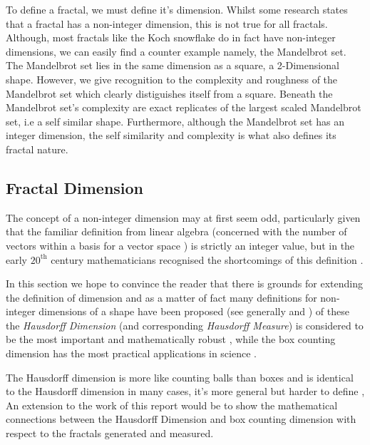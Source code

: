 \documentclass[11pt]{article}
\begin{document}
To define a fractal, we must define it's dimension. Whilst some research states that a fractal has a non-integer dimension, this is not true for all fractals. Although, most fractals like the Koch snowflake do in fact have non-integer dimensions, we can easily find a counter example namely, the Mandelbrot set. The Mandelbrot set lies in the same dimension as a square, a 2-Dimensional shape. However, we give recognition to the complexity and roughness of the Mandelbrot set which clearly distiguishes itself from a square. Beneath the Mandelbrot set's complexity are exact replicates of the largest scaled Mandelbrot set, i.e a self similar shape. Furthermore, although the Mandelbrot set has an integer dimension, the self similarity and complexity is what also defines its fractal nature.

\subsection{Fractal Dimension}
\label{sec:org9579076}
The concept of a non-integer dimension may at first seem odd, particularly given that the familiar definition from linear algebra (concerned with the number of vectors within a basis for a vector space \cite{larsonElementaryLinearAlgebra1991}) is strictly an integer value, but in the early \(20^{\mathrm{th}}\) century mathematicians recognised the shortcomings of this definition \cite[Ch. 3]{mandelbrotFractalGeometryNature1982}.

In this section we hope to convince the reader that there is grounds for
extending the definition of dimension and as a matter of fact many definitions
for non-integer dimensions of a shape have been proposed (see generally
\cite[Ch. 39]{mandelbrotFractalGeometryNature1982} and
\cite[\S 1.3]{gouyetPhysicsFractalStructures1996}) of these the \emph{Hausdorff Dimension} (and corresponding \emph{Hausdorff Measure}) is
considered to be the most important and mathematically robust
\cite[p. 27]{falconerFractalGeometryMathematical2003b}, while the box counting
dimension has the most practical applications in science
\cite[p. 192]{peitgenChaosFractalsNew2004}.

The Hausdorff dimension is more like counting balls than boxes and is identical
to the Hausdorff dimension in many cases, it's more general but harder to define
\cite{sandersonFractalsAreTypically2017}, An extension to the work of this report
would be to show the mathematical connections between the Hausdorff Dimension
and box counting dimension with respect to the fractals generated and measured.
\end{document}
